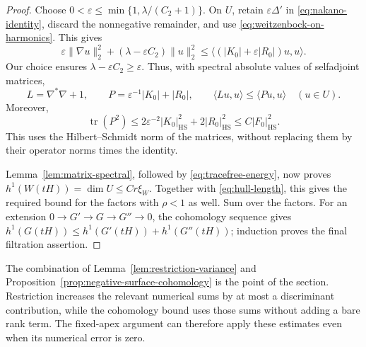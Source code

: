 \begin{proof}
Choose
$0<\varepsilon\le\min\{1,\lambda/(C_2+1)\}$.
On $U$, retain $\varepsilon\Delta'$ in
\eqref{eq:nakano-identity}, discard the nonnegative remainder,
and use \eqref{eq:weitzenbock-on-harmonics}.  This gives
\[
 \varepsilon\|\nabla u\|_2^2+
  (\lambda-\varepsilon C_2)\|u\|_2^2
 \le\langle(|K_0|+\varepsilon|R_0|)u,u\rangle.
\]
Our choice ensures $\lambda-\varepsilon C_2\ge\varepsilon$.
Thus, with spectral absolute values of selfadjoint matrices,
\[
 L=\nabla^*\nabla+1,\qquad
 P=\varepsilon^{-1}|K_0|+|R_0|,
 \qquad
 \langle Lu,u\rangle\le\langle Pu,u\rangle\quad(u\in U).
\]
Moreover,
\begin{equation}\label{eq:potential-trace}
 \operatorname{tr}(P^2)
 \le2\varepsilon^{-2}|K_0|_{\mathrm{HS}}^2
       +2|R_0|_{\mathrm{HS}}^2
 \le C|F_0|_{\mathrm{HS}}^2.
\end{equation}
This uses the Hilbert--Schmidt norm of the matrices, without
replacing them by their operator norms times the identity.

Lemma~\ref{lem:matrix-spectral}, followed by
\eqref{eq:tracefree-energy}, now proves
$h^1(W(tH))=\dim U\le Cr\xi_W$.
Together with \eqref{eq:hull-length}, this gives the required bound
for the factors with $\rho<1$ as well.  Sum over the factors.
For an extension $0\to G'\to G\to G''\to0$, the cohomology
sequence gives $h^1(G(tH))\le h^1(G'(tH))+h^1(G''(tH))$;
induction proves the final filtration assertion.
\end{proof}

The combination of Lemma~\ref{lem:restriction-variance} and
Proposition~\ref{prop:negative-surface-cohomology} is the point of
the section.  Restriction increases the relevant numerical sums by
at most a discriminant contribution, while the cohomology bound
uses those sums without adding a bare rank term.  The fixed-apex
argument can therefore apply these estimates even when its
numerical error is zero.
